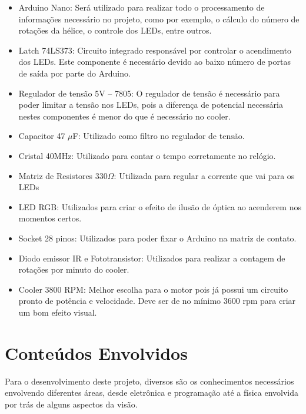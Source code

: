 \begin{itemize}
\item Arduino Nano: Será utilizado para realizar todo o processamento de informações necessário no projeto, como por exemplo, o cálculo do número de rotações da hélice, o controle dos LEDs, entre outros.
\item Latch 74LS373: Circuito integrado responsável por controlar o acendimento dos LEDs. Este componente é necessário devido ao baixo número de portas de saída por parte do Arduino.
\item Regulador de tensão 5V – 7805: O regulador de tensão é necessário para poder limitar a tensão nos LEDs, pois a diferença de potencial necessária nestes componentes é menor do que é necessário no cooler.
\item Capacitor 47 {$\mu$}F: Utilizado como filtro no regulador de tensão.
\item Cristal 40MHz: Utilizado para contar o tempo corretamente no relógio.
\item Matriz de Resistores 330{$\Omega$}: Utilizada para regular a corrente que vai para os LEDs
\item LED RGB: Utilizados para criar o efeito de ilusão de óptica ao acenderem nos momentos certos.
\item Socket 28 pinos: Utilizados para poder fixar o Arduino na matriz de contato.
\item Diodo emissor IR e Fototransistor: Utilizados para realizar a contagem de rotações por minuto do cooler.
\item Cooler 3800 RPM: Melhor escolha para o motor pois já possui um circuito pronto de potência e velocidade. Deve ser de no mínimo 3600 rpm para criar um bom efeito visual.
\end{itemize}

\section{Conteúdos Envolvidos} %

Para o desenvolvimento deste projeto, diversos são os conhecimentos necessários envolvendo diferentes áreas, desde eletrônica e programação até a física envolvida por trás de alguns aspectos da visão.

